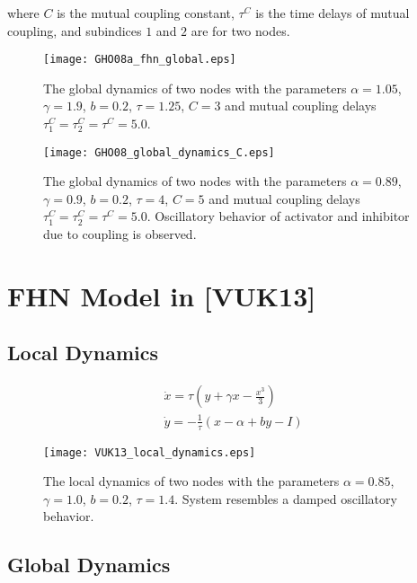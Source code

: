 \documentclass[12pt]{article}
\begin{document}
where $C$ is the mutual coupling constant, $\tau^C$ is the time delays of mutual coupling, and subindices $1$ and $2$ are for two nodes. 


\begin{figure}[h!]
	\centering
	\texttt{[image: GHO08a\_fhn\_global.eps]}
		\caption{The global dynamics of two nodes with the parameters $\alpha = 1.05$, $\gamma=1.9$, $b=0.2$, $\tau = 1.25$, $C=3$ and mutual coupling delays $\tau_1^C=\tau_2^C=\tau^C=5.0$.}
\end{figure}

\begin{figure}[h!]
	\centering
	\texttt{[image: GHO08\_global\_dynamics\_C.eps]}
		\caption{The global dynamics of two nodes with the parameters $\alpha = 0.89$, $\gamma=0.9$, $b=0.2$, $\tau = 4$, $C=5$ and mutual coupling delays $\tau_1^C=\tau_2^C=\tau^C=5.0$. Oscillatory behavior of activator and inhibitor due to coupling is observed.}
\end{figure}

\newpage

\section{FHN Model in [VUK13]} 

\subsection{Local Dynamics}
\begin{subequations}
 \begin{align}\dot{x} = \tau (y + \gamma x - \frac{x^3}{3})  \label{eqn: frobenius 17}\\  \dot{y} = -\frac{1}{\tau} (x - \alpha + b y - I ) \label{eqn: frobenius 18}   \end{align} 
\end{subequations}

\begin{figure}[h!]
	\centering
	\texttt{[image: VUK13\_local\_dynamics.eps]}
		\caption{The local dynamics of two nodes with the parameters $\alpha = 0.85$, $\gamma=1.0$, $b=0.2$, $\tau = 1.4$. System resembles a damped oscillatory behavior.}
\end{figure}

\newpage

\subsection{Global Dynamics}
\end{document}
